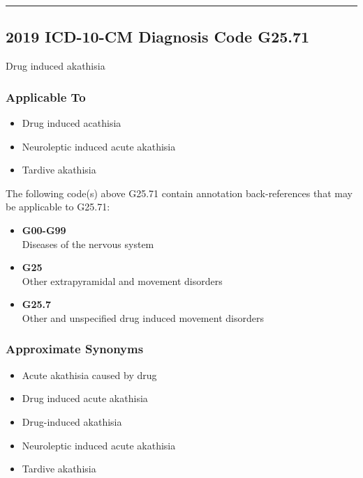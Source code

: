 \begin{center}\rule{0.5\linewidth}{\linethickness}\end{center}

\hypertarget{icd-10-cm-diagnosis-code-g25.71}{%
\subsection{2019 ICD-10-CM Diagnosis Code G25.71}\label{icd-10-cm-diagnosis-code-g25.71}}

\noindent Drug induced akathisia

\hypertarget{applicable-to-1}{%
\subsubsection{Applicable To}\label{applicable-to-1}}

\begin{itemize}
\tightlist
\item
  Drug induced acathisia
\item
  Neuroleptic induced acute akathisia
\item
  Tardive akathisia
\end{itemize}

\noindent The following code(s) above G25.71 contain annotation back-references that may be applicable to G25.71:

\begin{itemize}
\tightlist
\item
  \textbf{G00-G99}\\
  Diseases of the nervous system
\item
  \textbf{G25}\\
  Other extrapyramidal and movement disorders
\item
  \textbf{G25.7}\\
  Other and unspecified drug induced movement disorders
\end{itemize}

\hypertarget{approximate-synonyms-1}{%
\subsubsection{Approximate Synonyms}\label{approximate-synonyms-1}}

\begin{itemize}
\tightlist
\item
  Acute akathisia caused by drug
\item
  Drug induced acute akathisia
\item
  Drug-induced akathisia
\item
  Neuroleptic induced acute akathisia
\item
  Tardive akathisia
\end{itemize}

